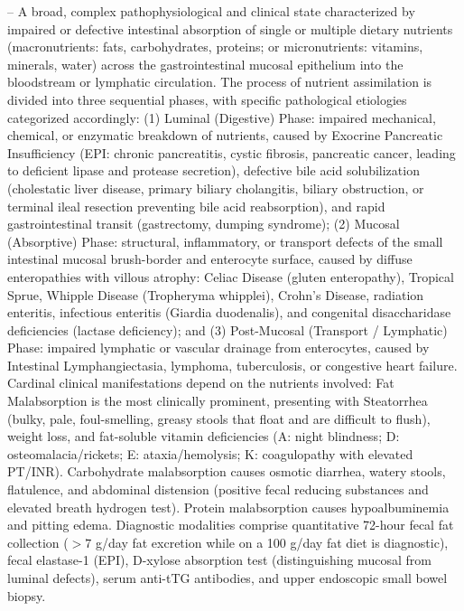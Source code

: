 -- A broad, complex pathophysiological and clinical state characterized by impaired or defective intestinal absorption of single or multiple dietary nutrients (macronutrients: fats, carbohydrates, proteins; or micronutrients: vitamins, minerals, water) across the gastrointestinal mucosal epithelium into the bloodstream or lymphatic circulation. The process of nutrient assimilation is divided into three sequential phases, with specific pathological etiologies categorized accordingly: (1) Luminal (Digestive) Phase: impaired mechanical, chemical, or enzymatic breakdown of nutrients, caused by Exocrine Pancreatic Insufficiency (EPI: chronic pancreatitis, cystic fibrosis, pancreatic cancer, leading to deficient lipase and protease secretion), defective bile acid solubilization (cholestatic liver disease, primary biliary cholangitis, biliary obstruction, or terminal ileal resection preventing bile acid reabsorption), and rapid gastrointestinal transit (gastrectomy, dumping syndrome); (2) Mucosal (Absorptive) Phase: structural, inflammatory, or transport defects of the small intestinal mucosal brush-border and enterocyte surface, caused by diffuse enteropathies with villous atrophy: Celiac Disease (gluten enteropathy), Tropical Sprue, Whipple Disease (Tropheryma whipplei), Crohn's Disease, radiation enteritis, infectious enteritis (Giardia duodenalis), and congenital disaccharidase deficiencies (lactase deficiency); and (3) Post-Mucosal (Transport / Lymphatic) Phase: impaired lymphatic or vascular drainage from enterocytes, caused by Intestinal Lymphangiectasia, lymphoma, tuberculosis, or congestive heart failure. Cardinal clinical manifestations depend on the nutrients involved: Fat Malabsorption is the most clinically prominent, presenting with Steatorrhea (bulky, pale, foul-smelling, greasy stools that float and are difficult to flush), weight loss, and fat-soluble vitamin deficiencies (A: night blindness; D: osteomalacia/rickets; E: ataxia/hemolysis; K: coagulopathy with elevated PT/INR). Carbohydrate malabsorption causes osmotic diarrhea, watery stools, flatulence, and abdominal distension (positive fecal reducing substances and elevated breath hydrogen test). Protein malabsorption causes hypoalbuminemia and pitting edema. Diagnostic modalities comprise quantitative 72-hour fecal fat collection ($>7$ g/day fat excretion while on a 100 g/day fat diet is diagnostic), fecal elastase-1 (EPI), D-xylose absorption test (distinguishing mucosal from luminal defects), serum anti-tTG antibodies, and upper endoscopic small bowel biopsy.

